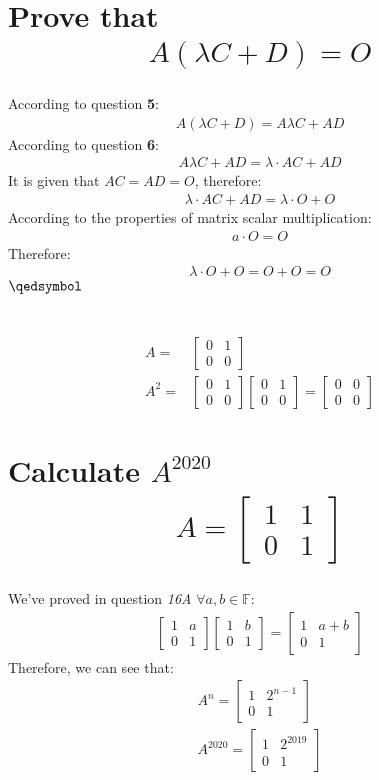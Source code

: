 \documentclass[a4paper, 12pt]{article}
\newcommand{\F}{\ensuremath{\mathbb{F}}}
\newcommand{\eq}[1]{\begin{align*}#1\end{align*}}
\renewcommand{\qed}{\hfill\(\qedsymbol\)}
\begin{document}
\section{Prove that \eq{A(\lambda{C}+D)=O}}
According to question \textbf{5}:
\eq{
    A(\lambda{C}+D)=A\lambda{C}+AD
}
According to question \textbf{6}:
\eq{
    A\lambda{C}+AD=\lambda\cdot{AC}+AD
}
It is given that $AC=AD=O$, therefore:
\eq{
    \lambda\cdot{AC}+AD=\lambda\cdot{O}+O
}
According to the properties of matrix scalar multiplication:
\eq{
    a\cdot{O}=O
}
Therefore:
\eq{
    \lambda\cdot{O}+O=O+O=O
}
\qed

\setcounter{section}{9}
\section{}
\eq{
    A=&\begin{bmatrix}
        0 & 1\\
        0 & 0
    \end{bmatrix}
    \\
    A^2=&\begin{bmatrix}
        0 & 1\\
        0 & 0
    \end{bmatrix}
    \begin{bmatrix}
        0 & 1\\
        0 & 0
    \end{bmatrix}
    =
    \begin{bmatrix}
        0 & 0\\
        0 & 0
    \end{bmatrix}
}

\section{Calculate $A^{2020}$
    \eq{
        A=\begin{bmatrix}
            1 & 1\\
            0 & 1
        \end{bmatrix}
    }
}
We've proved in question \textit{16A} $\forall{a,b}\in\F$:
\eq{
    \begin{bmatrix}
        1 & a\\
        0 & 1
    \end{bmatrix}
    \begin{bmatrix}
        1 & b\\
        0 & 1
    \end{bmatrix}
    =
    \begin{bmatrix}
        1 & a+b\\
        0 & 1
    \end{bmatrix}
}
Therefore, we can see that:
\eq{
        A^n=\begin{bmatrix}
            1 & 2^{n-1}\\
            0 & 1
        \end{bmatrix}
        \\
        A^{2020}=\begin{bmatrix}
            1 & 2^{2019}\\
            0 & 1
        \end{bmatrix}
}
\pagebreak
\end{document}
